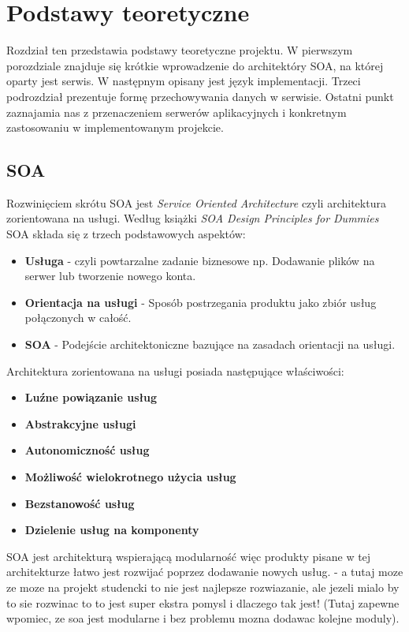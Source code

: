 \chapter{Podstawy teoretyczne}
\label{cha:podstawyTeoretyczne}
Rozdział ten przedstawia podstawy teoretyczne projektu. W pierwszym porozdziale znajduje się krótkie wprowadzenie do architektóry SOA, na której oparty jest serwis. W następnym opisany jest język implementacji. Trzeci podrozdział prezentuje formę przechowywania danych w serwisie. Ostatni punkt zaznajamia nas z przenaczeniem serwerów aplikacyjnych i konkretnym zastosowaniu w implementowanym projekcie.


\section{SOA}
\label{sec:soa}

Rozwinięciem skrótu SOA jest \textit{Service Oriented Architecture} czyli architektura zorientowana na usługi. Według książki \textit{SOA Design Principles for Dummies} SOA składa się z trzech podstawowych aspektów:
\begin{itemize}
	\item \textbf{Usługa} - czyli powtarzalne zadanie biznesowe np. Dodawanie plików na serwer lub tworzenie nowego konta.
	\item \textbf{Orientacja na usługi} - Sposób postrzegania produktu jako zbiór usług połączonych w całość.
	\item \textbf{SOA} - Podejście architektoniczne bazujące na zasadach orientacji na usługi.
\end{itemize}
Architektura zorientowana na usługi posiada następujące właściwości:
\begin{itemize}
	\item \textbf{Luźne powiązanie usług}
	\item \textbf{Abstrakcyjne usługi}
	\item \textbf{Autonomiczność usług}
	\item \textbf{Możliwość wielokrotnego użycia usług}
	\item \textbf{Bezstanowość usług}
	\item \textbf{Dzielenie usług na komponenty}
\end{itemize}
\cite{SOA13}
SOA jest architekturą wspierającą modularność więc produkty pisane w tej architekturze łatwo jest rozwijać poprzez dodawanie nowych usług. \newline
- a tutaj moze ze moze na projekt studencki to nie jest najlepsze rozwiazanie, ale jezeli mialo by to sie rozwinac to to jest super ekstra pomysl i dlaczego tak jest! (Tutaj zapewne wpomiec, ze soa jest modularne i bez problemu mozna dodawac kolejne moduly).\newline

